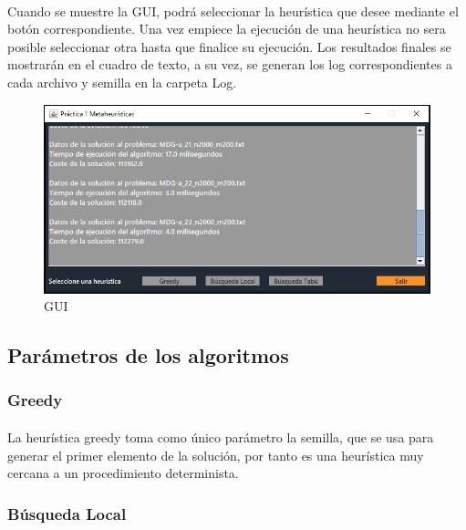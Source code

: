 \documentclass{article}
\begin{document}
		\paragraph{}Cuando se muestre la GUI, podrá seleccionar la heurística que desee mediante el botón correspondiente. Una vez empiece la ejecución de una heurística no sera posible seleccionar otra hasta que finalice su ejecución. Los resultados finales se mostrarán en el cuadro de texto, a su vez, se generan los log correspondientes a cada archivo y semilla en la carpeta Log.
	
		\begin{figure}[H]
		
			\centering
			\includegraphics[scale=0.4]{img/GUI}
			\caption{GUI}
		
		\end{figure}
	
	\subsection{Parámetros de los algoritmos}
	
		\subsubsection{Greedy}
		
				\paragraph{}La heurística greedy toma como único parámetro la semilla, que se usa para generar el primer elemento de la solución, por tanto es una heurística muy cercana a un procedimiento determinista.
	
		\subsubsection{Búsqueda Local}
		
\end{document}
